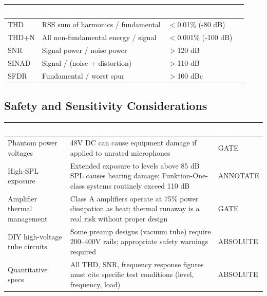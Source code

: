 \documentclass[11pt,letterpaper]{article}
\newcommand{\tableheader}[1]{\textbf{\sffamily\textcolor{white}{#1}}}
\begin{document}
\begin{center}
\begin{tabularx}{\textwidth}{L{3.5cm}XL{3cm}}
\toprule
{}
\tableheader{Metric} & \tableheader{Definition} & \tableheader{Typical Good Value} \\
\midrule
THD & RSS sum of harmonics / fundamental & $<$0.01\% (-80 dB) \\
THD+N & All non-fundamental energy / signal & $<$0.001\% (-100 dB) \\
SNR & Signal power / noise power & $>$120 dB \\
SINAD & Signal / (noise + distortion) & $>$110 dB \\
SFDR & Fundamental / worst spur & $>$100 dBc \\
\bottomrule
\end{tabularx}
\end{center}

\subsection{Safety and Sensitivity Considerations}

\begin{center}
\begin{tabularx}{\textwidth}{L{3.5cm}XL{2cm}}
\toprule
{}
\tableheader{Area} & \tableheader{Consideration} & \tableheader{Rule Type} \\
\midrule
Phantom power voltages & 48V DC can cause equipment damage if applied to unrated microphones & GATE \\
High-SPL exposure & Extended exposure to levels above 85 dB SPL causes hearing damage; Funktion-One-class systems routinely exceed 110 dB & ANNOTATE \\
Amplifier thermal management & Class A amplifiers operate at 75\% power dissipation as heat; thermal runaway is a real risk without proper design & GATE \\
DIY high-voltage tube circuits & Some preamp designs (vacuum tube) require 200--400V rails; appropriate safety warnings required & ABSOLUTE \\
Quantitative specs & All THD, SNR, frequency response figures must cite specific test conditions (level, frequency, load) & ABSOLUTE \\
\bottomrule
\end{tabularx}
\end{center}
\end{document}
